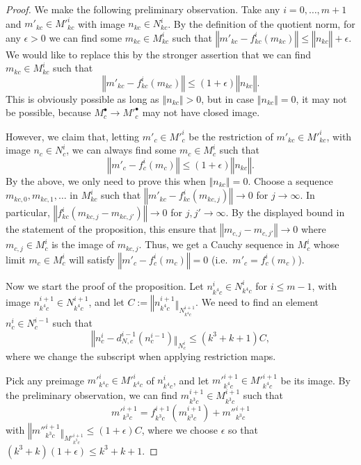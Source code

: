 \begin{proof}
  We make the following preliminary observation.
  Take any $i=0,\ldots,m+1$ and $m'_{kc}\in M'^i_{kc}$ with image $n_{kc}\in N^i_{kc}$.
  By the definition of the quotient norm,
  for any $\epsilon>0$ we can find some $m_{kc}\in M^i_{kc}$
  such that $‖m'_{kc}-f^i_{kc}(m_{kc})‖\leq ‖n_{kc}‖+\epsilon$.
  We would like to replace this by the stronger assertion that we can find $m_{kc}\in M^i_{kc}$ such that
\[
‖m'_{kc}-f^i_{kc}(m_{kc})‖\leq (1+\epsilon)‖n_{kc}‖.
\]
This is obviously possible as long as $‖n_{kc}‖>0$, but in case $‖n_{kc}‖=0$, it may not be possible, because $M^\bullet_c\to M'^\bullet_c$ may not have closed image.

However, we claim that, letting $m'_c\in M'^i_c$ be the restriction of $m'_{kc}\in M'^i_{kc}$, with image $n_c\in N^i_c$, we can always find some $m_c\in M^i_c$ such that
\[
‖m'_c-f^i_c(m_c)‖\leq (1+\epsilon)‖n_{kc}‖.
\]
By the above, we only need to prove this when $‖n_{kc}‖=0$. Choose a sequence $m_{kc,0},m_{kc,1},\ldots$ in $M^i_{kc}$ such that $‖m'_{kc}-f^i_{kc}(m_{kc,j})‖\to 0$ for $j\to \infty$. In particular, $‖f^i_{kc}(m_{kc,j}-m_{kc,j'})‖\to 0$ for $j,j'\to \infty$. By the displayed bound in the statement of the proposition, this ensure that $‖m_{c,j}-m_{c,j'}‖\to 0$ where $m_{c,j}\in M^i_c$ is the image of $m_{kc,j}$. Thus, we get a Cauchy sequence in $M^i_c$ whose limit $m_c\in M^i_c$ will satisfy $‖m'_c-f^i_c(m_c)‖=0$ (i.e.~$m'_c=f^i_c(m_c)$).

Now we start the proof of the proposition. Let $n^i_{k^4c}\in N^i_{k^4c}$ for $i\leq m-1$, with image $n^{i+1}_{k^4c}\in N^{i+1}_{k^4c}$, and let $C:=‖n^{i+1}_{k^4c}‖_{N^{i+1}_{k^4c}}$. We need to find an element $n^i_c\in N^{i-1}_c$ such that
\[
‖n^i_c - d^{i-1}_{N,c}(n^{i-1}_c)‖_{N^i_c}\leq (k^3+k+1)C,
\]
where we change the subscript when applying restriction maps.

Pick any preimage $m'^i_{k^4c}\in M'^i_{k^4c}$ of $n^i_{k^4c}$, and let $m'^{i+1}_{k^4c}\in M'^{i+1}_{k^4c}$ be its image. By the preliminary observation, we can find $m^{i+1}_{k^3c}\in M^{i+1}_{k^3c}$ such that
\[
m'^{i+1}_{k^3c} = f^{i+1}_{k^3c}(m^{i+1}_{k^3c}) + m''^{i+1}_{k^3c}
\]
with $‖m''^{i+1}_{k^3c}‖_{M'^{i+1}_{k^3c}}\leq (1+\epsilon)C$, where we choose $\epsilon$ so that $(k^3+k)(1+\epsilon)\leq k^3+k+1$.


\end{proof}
